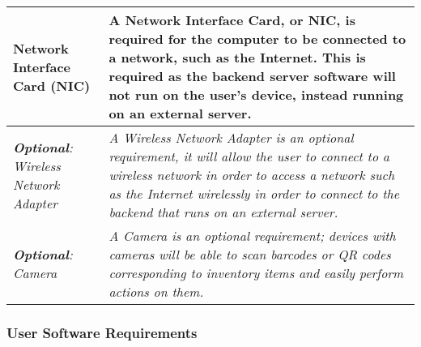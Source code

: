 \documentclass[../../../main.tex]{subfiles}
\begin{document}
\begin{tabular}{ |p{}|p{}| }
    \hline
    Network Interface Card (NIC)                         & A Network Interface Card, or NIC, is required for the computer to be connected to a network, such as the Internet. This is required as the backend server software will not run on the user's device, instead running on an external server.             \\
    \hline
    \textit{\textbf{Optional}: Wireless Network Adapter} & \textit{A Wireless Network Adapter is an optional requirement, it will allow the user to connect to a wireless network in order to access a network such as the Internet wirelessly in order to connect to the backend that runs on an external server.} \\
    \hline
    \textit{\textbf{Optional}: Camera}                   & \textit{A Camera is an optional requirement; devices with cameras will be able to scan barcodes or QR codes corresponding to inventory items and easily perform actions on them.}                                                                        \\
    \hline
\end{tabular}

\pagebreak

\subsubsection{User Software Requirements}
\end{document}
